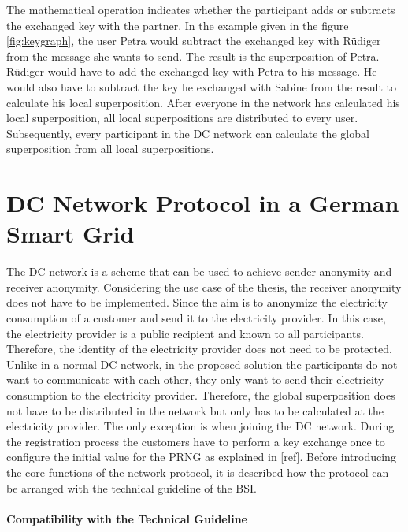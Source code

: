 The mathematical operation indicates whether the participant adds or subtracts the exchanged key with the partner. In the example given in the figure \ref{fig:keygraph}, the user Petra would subtract the exchanged key with Rüdiger from the message she wants to send. The result is the superposition of Petra. Rüdiger would have to add the exchanged key with Petra to his message. He would also have to subtract the key he exchanged with Sabine from the result to calculate his local superposition. After everyone in the network has calculated his local superposition, all local superpositions are distributed to every user. Subsequently, every participant in the DC network can calculate the global superposition from all local superpositions.

\section{DC Network Protocol in a German Smart Grid}
The DC network is a scheme that can be used to achieve sender anonymity and receiver anonymity. Considering the use case of the thesis, the receiver anonymity does not have to be implemented. Since the aim is to anonymize the electricity consumption of a customer and send it to the electricity provider. In this case, the electricity provider is a public recipient and known to all participants. Therefore, the identity of the electricity provider does not need to be protected. Unlike in a normal DC network, in the proposed solution the participants do not want to communicate with each other, they only want to send their electricity consumption to the electricity provider. Therefore, the global superposition does not have to be distributed in the network but only has to be calculated at the electricity provider. The only exception is when joining the DC network.
During the registration process the customers have to perform a key exchange once to configure the initial value for the PRNG as explained in [ref]. Before introducing the core functions of the network protocol, it is described how the protocol can be arranged with the technical guideline of the BSI.\\
\\
\textbf{Compatibility with the Technical Guideline}
\\
\\
